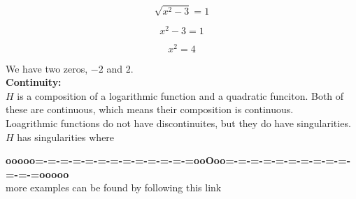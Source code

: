 \documentclass{ximera}
\begin{document}
\[
\sqrt{x^2-3} = 1
\]


\[
x^2-3 = 1
\]

\[
x^2 = 4
\]


We have two zeros, $-2$ and $2$. \\




\textbf{\textcolor{blue!55!black}{Continuity:}} \\


$H$ is a composition of a logarithmic function and a quadratic funciton.  Both of these are continuous, which means their composition is continuous. \\

Loagrithmic functions do not have discontinuites, but they do have singularities.  $H$ has singularities where 











\begin{center}
\textbf{\textcolor{green!50!black}{ooooo=-=-=-=-=-=-=-=-=-=-=-=-=ooOoo=-=-=-=-=-=-=-=-=-=-=-=-=ooooo}} \\

more examples can be found by following this link\\ 

\end{center}
\end{document}
